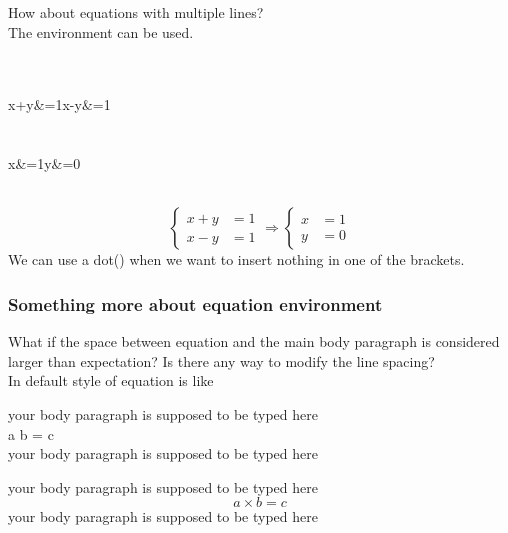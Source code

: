 \begin{frame}
	How about equations with multiple lines?\\
	The  environment can be used.
	\begin{example}
		\\
		\qquad {}\\
		\qquad\qquad x+y\&=1\samplecommand{\textbackslash}x-y\&=1\\
		\qquad {}\\
		\qquad {}\\
		\qquad\qquad x\&=1\samplecommand{\textbackslash}y\&=0\\
		\qquad {}\\
	\end{example}	
	\begin{equation}
	\left\lbrace\begin{aligned}
		x+y&=1\\x-y&=1
	\end{aligned}\right.\Longrightarrow
	\left\lbrace\begin{aligned}
		x&=1\\y&=0
	\end{aligned}\right.
	\end{equation}	
	We can use a dot() when we want to insert nothing in one of the brackets.
\end{frame}

\begin{frame}
	\frametitle{Something more about equation environment}
    What if the space between equation and the main body paragraph is considered larger than expectation? Is there any way to modify the line spacing?
\\In default style of equation is like
    \begin{example}
		your body paragraph is supposed to be typed here\\
		a  b = c \sampleend{equation}\\
		your body paragraph is supposed to be typed here\\
	\end{example}
    your body paragraph is supposed to be typed here
        \begin{equation}
         a \times b =c
        \end{equation}
    your body paragraph is supposed to be typed here
\end{frame}

